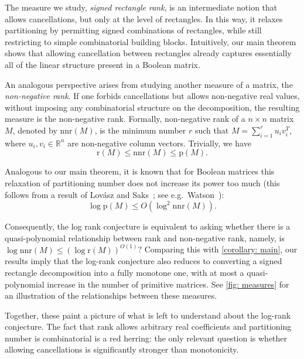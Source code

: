 \documentclass[11pt]{article}
\theoremstyle{plain}
\theoremstyle{remark}
\def\r{{\mathrm{r}}}
\def\p{{\mathrm{p}}}
\def\nnr{{\mathrm{nnr}}}
\newcommand{\R}{\mathbb{R}}
\begin{document}
The measure we study, \emph{signed rectangle rank}, is an intermediate notion that allows cancellations, but only at the level of rectangles. In this way, it relaxes partitioning by permitting signed combinations of rectangles, while still restricting to simple combinatorial building blocks. Intuitively, our main theorem shows that allowing cancellation between rectangles already captures essentially all of the linear structure present in a Boolean matrix.

An analogous perspective arises from studying another measure of a matrix, the \emph{non-negative rank}. If one forbids cancellations but allows non-negative real values, without imposing any combinatorial structure on the decomposition, the resulting measure is the non-negative rank. Formally, non-negative rank of a $n \times n$ matrix $M$, denoted by $\nnr(M)$, is the minimum number $r$ such that $M=\sum_{i=1}^{r} u_i v_i^T$, where $u_i,v_i \in \R^n$ are non-negative column vectors. Trivially, we have
\[ \r(M) \leq \nnr(M) \leq \p(M). \]

Analogous to our main theorem, it is known that for Boolean matrices this relaxation of partitioning number does not increase its power too much (this follows from a result of Lovász and Saks~\cite{lovaszCommunication1993}; see e.g.\ Watson~\cite{WatNonnegative2016}):
\[ \log \p(M) \leq O(\log^2 \nnr(M)). \]

Consequently, the log rank conjecture is equivalent to asking whether there is a quasi-polynomial relationship between rank and non-negative rank, namely, is $\log \nnr(M) \leq (\log \r(M))^{O(1)}$? Comparing this with \cref{corollary: main}, our results imply that the log-rank conjecture also reduces to converting a signed rectangle decomposition into a fully monotone one, with at most a quasi-polynomial increase in the number of primitive matrices. See \cref{fig: measures} for an illustration of the relationships between these measures.

Together, these paint a picture of what is left to understand about the log-rank conjecture. The fact that rank allows arbitrary real coefficients and partitioning number is combinatorial is a red herring: the only relevant question is whether allowing cancellations is significantly stronger than monotonicity.
\end{document}

